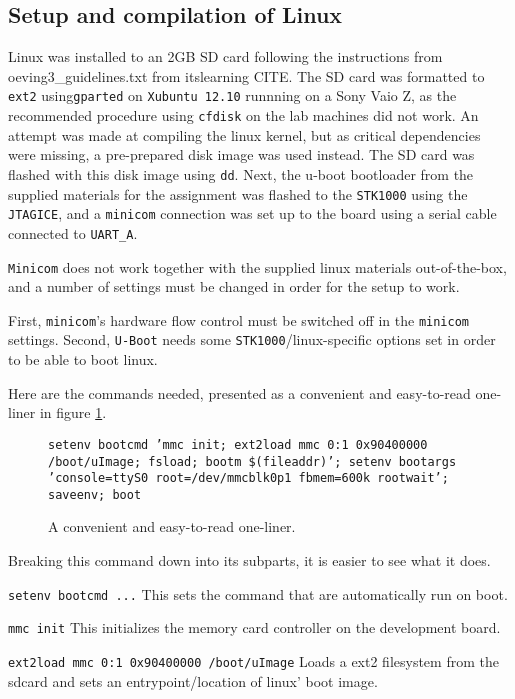
\subsection{Setup and compilation of Linux}

Linux was installed to an 2GB SD card following the instructions from oeving3\_guidelines.txt from itslearning CITE. 
The SD card was formatted to \texttt{ext2} using\texttt{gparted} on \texttt{Xubuntu 12.10} runnning on a Sony Vaio Z, as the recommended procedure using \texttt{cfdisk} on the lab machines did not work.
An attempt was made at compiling the linux kernel, but as critical dependencies were missing, a pre-prepared disk image was used instead. The SD card was flashed with this disk image using \texttt{dd}.
Next, the u-boot bootloader from the supplied materials for the assignment was flashed to the \texttt{STK1000} using the \texttt{JTAGICE}, and a \texttt{minicom} connection was set up to the board using a serial cable connected to \texttt{UART\_A}.

\texttt{Minicom} does not work together with the supplied linux materials out-of-the-box, and a number of settings must be changed in order for the setup to work.


First, \texttt{minicom}'s hardware flow control must be switched off in the \texttt{minicom} settings.
Second, \texttt{U-Boot} needs some \texttt{STK1000}/linux-specific options set in order to be able to boot linux.


Here are the commands needed, presented as a convenient and easy-to-read one-liner in figure \ref{fig-ubootcommand}.


\begin{figure}
\texttt{setenv bootcmd 'mmc init; ext2load mmc 0:1 0x90400000 /boot/uImage; fsload; bootm \$(fileaddr)'; setenv bootargs 'console=ttyS0 root=/dev/mmcblk0p1 fbmem=600k rootwait'; saveenv; boot}
\label{fig-ubootcommand}
\caption{A convenient and easy-to-read one-liner.}
\end{figure}


Breaking this command down into its subparts, it is easier to see what it does.


\texttt{setenv bootcmd ...} 
This sets the command that are automatically run on boot.

\texttt{mmc init} 
This initializes the memory card controller on the development board.

\texttt{ext2load mmc 0:1 0x90400000 /boot/uImage} 
Loads a ext2 filesystem from the sdcard and sets an entrypoint/location of linux' boot image.

